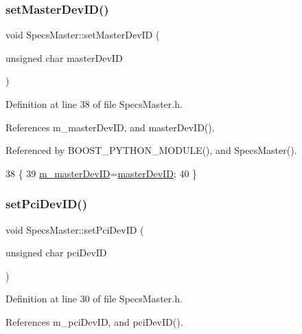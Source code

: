 \subsubsection{\texorpdfstring{set\+Master\+Dev\+I\+D()}{setMasterDevID()}}
{\footnotesize\ttfamily void Specs\+Master\+::set\+Master\+Dev\+ID (\begin{DoxyParamCaption}\item[{unsigned char}]{master\+Dev\+ID }\end{DoxyParamCaption})\hspace{0.3cm}{\ttfamily [inline]}}



Definition at line 38 of file Specs\+Master.\+h.



References m\+\_\+master\+Dev\+ID, and master\+Dev\+I\+D().



Referenced by B\+O\+O\+S\+T\+\_\+\+P\+Y\+T\+H\+O\+N\+\_\+\+M\+O\+D\+U\+L\+E(), and Specs\+Master().


\begin{DoxyCode}
38                                                 \{
39     \hyperlink{classSpecsMaster_a46913a84dbe228a115ee1b90c82e44e2}{m\_masterDevID}=\hyperlink{classSpecsMaster_a7bbbc2994a3e17bb91a0651eaa241842}{masterDevID};
40   \}
\end{DoxyCode}
\mbox{\label{classSpecsMaster_a3c55e5652286c35baa41fccd240c8cb5}} 
\subsubsection{\texorpdfstring{set\+Pci\+Dev\+I\+D()}{setPciDevID()}}
{\footnotesize\ttfamily void Specs\+Master\+::set\+Pci\+Dev\+ID (\begin{DoxyParamCaption}\item[{unsigned char}]{pci\+Dev\+ID }\end{DoxyParamCaption})\hspace{0.3cm}{\ttfamily [inline]}}



Definition at line 30 of file Specs\+Master.\+h.



References m\+\_\+pci\+Dev\+ID, and pci\+Dev\+I\+D().



